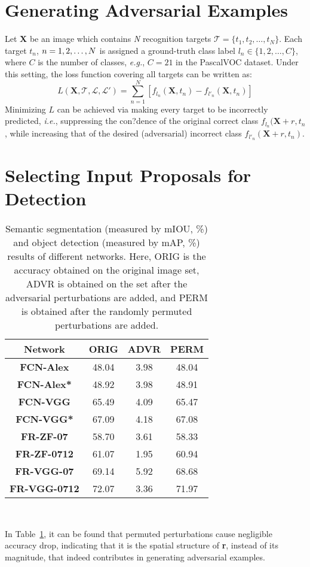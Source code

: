 \documentclass[10pt,twocolumn,letterpaper]{article}
\begin{document}
\section{Generating Adversarial Examples}
Let \textbf{X} be an image which contains {\em N} recognition targets $\mathcal{T}=\{t_1,t_2,\dots,t_N\}$. Each target $t_n$, $n={\rm 1,2},\dots,N$ is assigned a ground-truth class label $l_n\in\{1,2,\dots,C\}$, where $C$ is the number of classes, {\em e.g.}, $C=21$ in the PascalVOC dataset. Under this setting, the loss function covering all targets can be written as:
\begin{equation}
L(\textbf{X},\mathcal{T,L,L'})=\sum_{n=1}^N[f_{l_n}(\textbf{X},t_n)-f_{l'_n}(\textbf{X},t_n)]
\end{equation}
Minimizing $L$ can be achieved via making every target to be incorrectly predicted, {\em i.e.}, suppressing the con?dence of the original correct class $f_{l_n}(\textbf{X}+r,t_n$, while increasing that of the desired (adversarial) incorrect class $f_{l'_n}(\textbf{X}+r,t_n)$.
\section{Selecting Input Proposals for Detection}
\begin{table}[htbp]
\small
\renewcommand\arraystretch{1.2}
\centering
\begin{tabular}{|c|c|c|c|}
\hline
Network & ORIG & ADVR & PERM  \\
\hline
\hline
\textbf{FCN-Alex} & 48.04 & 3.98 & 48.04  \\
\textbf{FCN-Alex*} & 48.92 & 3.98 & 48.91 \\
\textbf{FCN-VGG} & 65.49 & 4.09 & 65.47 \\
\textbf{FCN-VGG*} & 67.09 & 4.18 & 67.08  \\
\hline
\hline
\textbf{FR-ZF-07} & 58.70 & 3.61 & 58.33 \\
\textbf{FR-ZF-0712} & 61.07 & 1.95 & 60.94  \\
\textbf{FR-VGG-07} & 69.14 & 5.92 & 68.68 \\
\textbf{FR-VGG-0712} & 72.07 & 3.36 & 71.97 \\
\hline
\end{tabular} \\
\caption{Semantic segmentation (measured by mIOU, \%) and object detection (measured by mAP, \%) results of different networks. Here, ORIG is the accuracy obtained on the original image set, ADVR is obtained on the set after the adversarial perturbations are added, and PERM is obtained after the randomly permuted perturbations are added.} \label{tab1}
\end{table}
\par
In Table~\ref{tab1}, it can be found that permuted perturbations cause negligible accuracy drop, indicating that it is the spatial structure of \textbf{r}, instead of its magnitude, that indeed contributes in generating adversarial examples.
{\small


}
\end{document}

